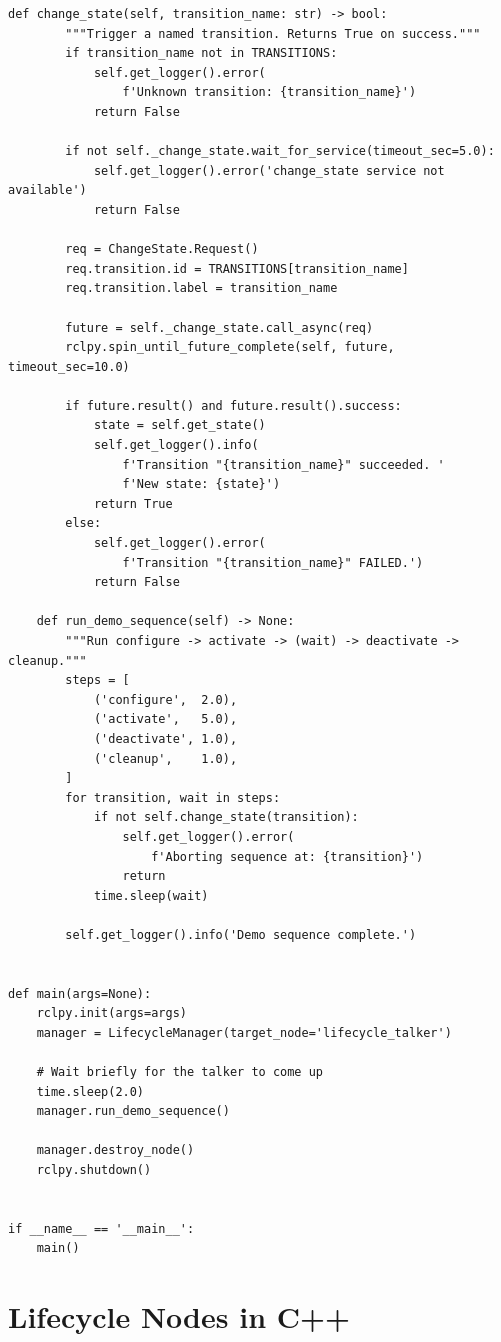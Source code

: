 \documentclass[12pt,a4paper]{article}
\begin{document}
\begin{lstlisting}[style=python,caption={lifecycle\_manager.py}]
    def change_state(self, transition_name: str) -> bool:
        """Trigger a named transition. Returns True on success."""
        if transition_name not in TRANSITIONS:
            self.get_logger().error(
                f'Unknown transition: {transition_name}')
            return False

        if not self._change_state.wait_for_service(timeout_sec=5.0):
            self.get_logger().error('change_state service not available')
            return False

        req = ChangeState.Request()
        req.transition.id = TRANSITIONS[transition_name]
        req.transition.label = transition_name

        future = self._change_state.call_async(req)
        rclpy.spin_until_future_complete(self, future, timeout_sec=10.0)

        if future.result() and future.result().success:
            state = self.get_state()
            self.get_logger().info(
                f'Transition "{transition_name}" succeeded. '
                f'New state: {state}')
            return True
        else:
            self.get_logger().error(
                f'Transition "{transition_name}" FAILED.')
            return False

    def run_demo_sequence(self) -> None:
        """Run configure -> activate -> (wait) -> deactivate -> cleanup."""
        steps = [
            ('configure',  2.0),
            ('activate',   5.0),
            ('deactivate', 1.0),
            ('cleanup',    1.0),
        ]
        for transition, wait in steps:
            if not self.change_state(transition):
                self.get_logger().error(
                    f'Aborting sequence at: {transition}')
                return
            time.sleep(wait)

        self.get_logger().info('Demo sequence complete.')


def main(args=None):
    rclpy.init(args=args)
    manager = LifecycleManager(target_node='lifecycle_talker')

    # Wait briefly for the talker to come up
    time.sleep(2.0)
    manager.run_demo_sequence()

    manager.destroy_node()
    rclpy.shutdown()


if __name__ == '__main__':
    main()
\end{lstlisting}

\section{Lifecycle Nodes in C++}
\label{sec:cpp}
\end{document}
